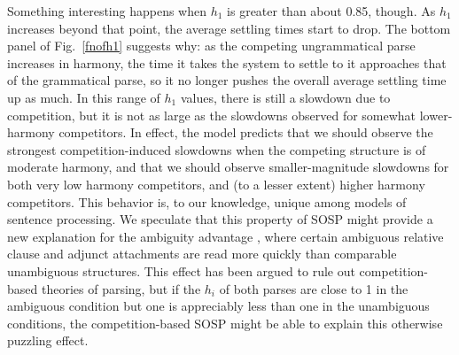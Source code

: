 \documentclass[10pt,letterpaper]{article}
\begin{document}
Something interesting happens when $h_1$ is greater than about 0.85, though. As $h_1$ increases beyond that point, the average settling times start to drop. The bottom panel of Fig.~\ref{fnofh1} suggests why: as the competing ungrammatical parse increases in harmony, the time it takes the system to settle to it approaches that of the grammatical parse, so it no longer pushes the overall average settling time up as much. In this range of $h_1$ values, there is still a slowdown due to competition, but it is not as large as the slowdowns observed for somewhat lower-harmony competitors. In effect, the model predicts that we should observe the strongest competition-induced slowdowns when the competing structure is of moderate harmony, and that we should observe smaller-magnitude slowdowns for both very low harmony competitors, and (to a lesser extent) higher harmony competitors. This behavior is, to our knowledge, unique among models of sentence processing. We speculate that this property of SOSP might provide a new explanation for the ambiguity advantage \cite[e.g.]{traxler1998adjunct}, where certain ambiguous relative clause and adjunct attachments are  read more quickly than comparable unambiguous structures. This effect has been argued to rule out competition-based theories of parsing, but if the $h_i$ of both parses are close to 1 in the ambiguous condition but one is appreciably less than one in the unambiguous conditions, the competition-based SOSP might be able to explain this otherwise puzzling effect. %
\end{document}
